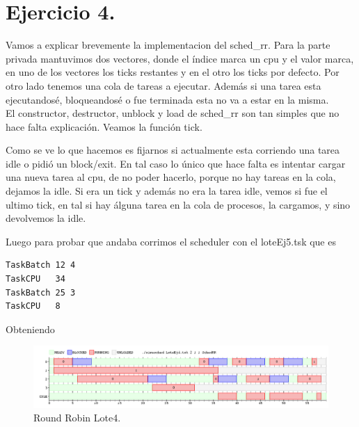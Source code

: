 \section{Ejercicio 4.}

Vamos a explicar brevemente la implementacion del sched\_rr. Para la parte privada mantuvimos dos vectores, donde el índice marca un cpu y el valor marca, en uno de los vectores los ticks restantes y en el otro los ticks por defecto. Por otro lado tenemos una cola de tareas a ejecutar. Además si una tarea esta ejecutandosé, bloqueandosé o fue terminada esta no va a estar en la misma. \\
El constructor, destructor, unblock y load de sched\_rr son tan simples que no hace falta explicación. Veamos la función tick.



Como se ve lo que hacemos es fijarnos si actualmente esta corriendo una tarea idle o pidió un block/exit. En tal caso lo único que hace falta es intentar cargar una nueva tarea al cpu, de no poder hacerlo, porque no hay tareas en la cola, dejamos la idle. Si era un tick y además no era la tarea idle, vemos si fue el ultimo tick, en tal si hay álguna tarea en la cola de procesos, la cargamos, y sino devolvemos la idle.

Luego para probar que andaba corrimos el scheduler con el loteEj5.tsk que es

\begin{Verbatim}
TaskBatch 12 4
TaskCPU   34
TaskBatch 25 3
TaskCPU   8
\end{Verbatim}

Obteniendo

\begin{figure}[h]
    \centerline{\includegraphics[scale=0.55]{images/imgEjercicio4}}
    \caption{Round Robin Lote4.}
\end{figure}

